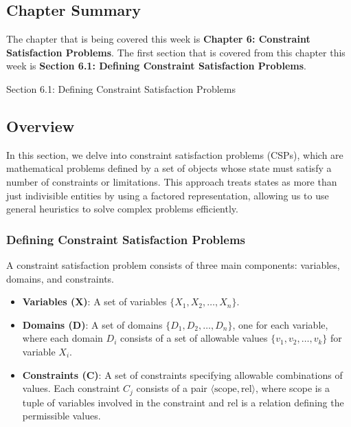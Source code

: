 \newpage

\subsection{Chapter Summary}

The chapter that is being covered this week is \textbf{Chapter 6: Constraint Satisfaction Problems}. The first section that is covered from this chapter this week is \textbf{Section 6.1: Defining Constraint Satisfaction Problems}.

\begin{notes}{Section 6.1: Defining Constraint Satisfaction Problems}
    \subsection*{Overview}

    In this section, we delve into constraint satisfaction problems (CSPs), which are mathematical problems defined by a set of objects whose state must satisfy a number of constraints or limitations. 
    This approach treats states as more than just indivisible entities by using a factored representation, allowing us to use general heuristics to solve complex problems efficiently.
    
    \subsubsection*{Defining Constraint Satisfaction Problems}
    
    A constraint satisfaction problem consists of three main components: variables, domains, and constraints.
    
    \begin{highlight}
    
        \begin{itemize}
            \item \textbf{Variables (X)}: A set of variables $\{X_1, X_2, \ldots, X_n\}$.
            \item \textbf{Domains (D)}: A set of domains $\{D_1, D_2, \ldots, D_n\}$, one for each variable, where each domain $D_i$ consists of a set of allowable values $\{v_1, v_2, \ldots, v_k\}$ for variable $X_i$.
            \item \textbf{Constraints (C)}: A set of constraints specifying allowable combinations of values. Each constraint $C_j$ consists of a pair $\langle \text{scope}, \text{rel} \rangle$, 
            where scope is a tuple of variables involved in the constraint and rel is a relation defining the permissible values.
        \end{itemize}
    

\end{highlight}
\end{notes}
